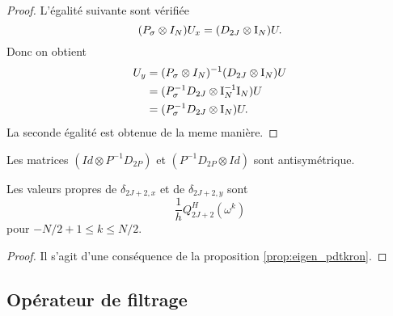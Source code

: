 \begin{proof}
L'égalité suivante sont vérifiée
\begin{equation}
(P_{\sigma} \otimes I_N) U_x = (D_{2J} \otimes \text{I}_N) U.
\end{equation}
Donc on obtient
\begin{align*}
U_y & = (P_{\sigma} \otimes I_N)^{-1}(D_{2J} \otimes \text{I}_N) U \\
	& = (P^{-1}_{\sigma} D_{2J} \otimes \text{I}_N^{-1}\text{I}_N) U \\
	& = (P^{-1}_{\sigma} D_{2J} \otimes \text{I}_N) U.
\end{align*}
La seconde égalité est obtenue de la meme manière.
\end{proof}

Les matrices $(Id \otimes P^{-1}D_{2P})$ et $(P^{-1}D_{2P} \otimes Id)$ sont antisymétrique.

\begin{proposition}
Les valeurs propres de $\delta_{2J+2,x}$ et de $\delta_{2J+2,y}$ sont
\begin{equation}
\dfrac{1}{h}Q^H_{2J+2}(\omega^k)
\end{equation}
pour $-N/2+1 \leq k \leq N/2$.
\end{proposition}

\begin{proof}
Il s'agit d'une conséquence de la proposition \ref{prop:eigen_pdtkron}.
\end{proof}











\subsection{Opérateur de filtrage}

